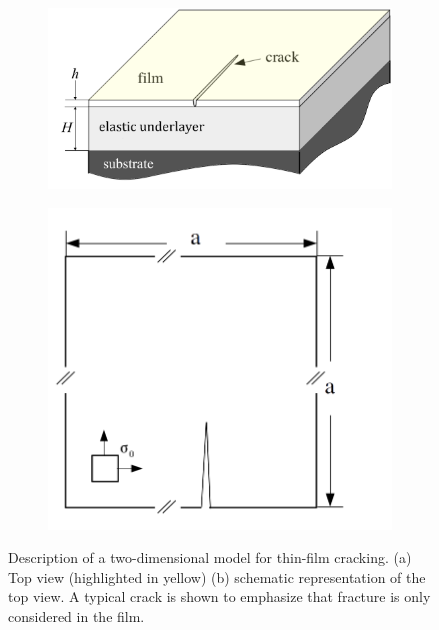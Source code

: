 \begin{figure}[htb!]
  \centering
  \begin{subfigure}[b]{0.35\textwidth}
    \centering
    \includegraphics[width=\textwidth,scale=0.5]{Chapter4/figures/2D/top_view.png}
    \caption{}
  \end{subfigure}
  \hspace{0.1\textwidth}
  \begin{subfigure}[b]{0.3\textwidth}
    \centering
    \includegraphics[width=\textwidth,scale=0.5]{Chapter4/figures/2D/2D_schematic.png}
    \caption{}
  \end{subfigure}
  \caption[Description of a two-dimensional model for thin-film cracking.]{Description of a two-dimensional model for thin-film cracking. (a) Top view (highlighted in yellow) (b) schematic representation of the top view. A typical crack is shown to emphasize that fracture is only considered in the film. }
  \label{fig: Chapter4/2D/simplification}
\end{figure}
